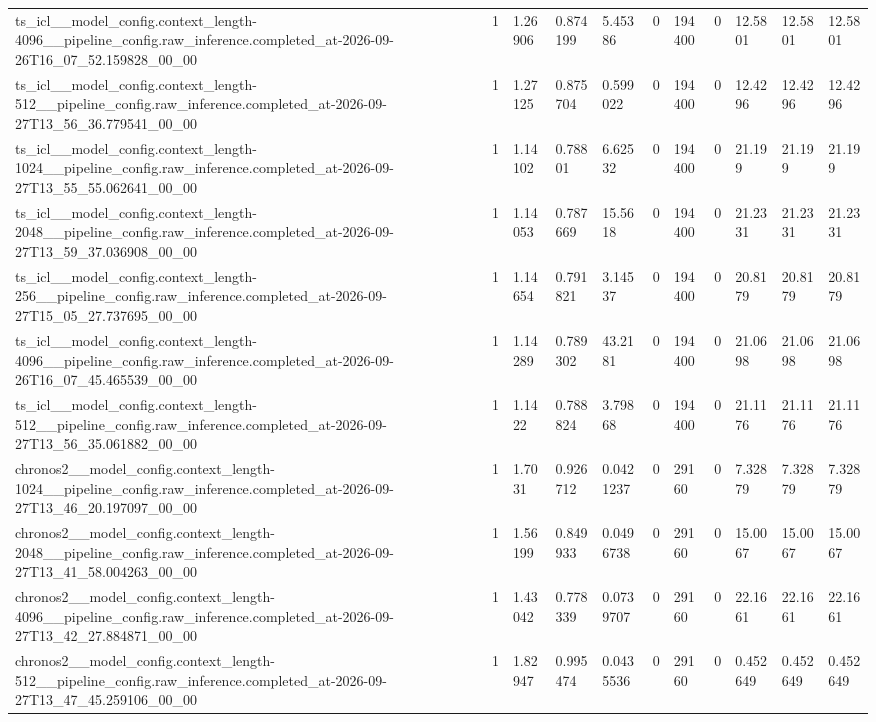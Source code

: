 \begin{tabular}{lllllllllll}
ts\_icl\_\_model\_config.context\_length-4096\_\_pipeline\_config.raw\_inference.completed\_at-2026-09-26T16\_07\_52.159828\_00\_00 & 1 & 1.26906 & 0.874199 & 5.45386 & 0 & 194400 & 0 & 12.5801 & 12.5801 & 12.5801 \\
ts\_icl\_\_model\_config.context\_length-512\_\_pipeline\_config.raw\_inference.completed\_at-2026-09-27T13\_56\_36.779541\_00\_00 & 1 & 1.27125 & 0.875704 & 0.599022 & 0 & 194400 & 0 & 12.4296 & 12.4296 & 12.4296 \\
ts\_icl\_\_model\_config.context\_length-1024\_\_pipeline\_config.raw\_inference.completed\_at-2026-09-27T13\_55\_55.062641\_00\_00 & 1 & 1.14102 & 0.78801 & 6.62532 & 0 & 194400 & 0 & 21.199 & 21.199 & 21.199 \\
ts\_icl\_\_model\_config.context\_length-2048\_\_pipeline\_config.raw\_inference.completed\_at-2026-09-27T13\_59\_37.036908\_00\_00 & 1 & 1.14053 & 0.787669 & 15.5618 & 0 & 194400 & 0 & 21.2331 & 21.2331 & 21.2331 \\
ts\_icl\_\_model\_config.context\_length-256\_\_pipeline\_config.raw\_inference.completed\_at-2026-09-27T15\_05\_27.737695\_00\_00 & 1 & 1.14654 & 0.791821 & 3.14537 & 0 & 194400 & 0 & 20.8179 & 20.8179 & 20.8179 \\
ts\_icl\_\_model\_config.context\_length-4096\_\_pipeline\_config.raw\_inference.completed\_at-2026-09-26T16\_07\_45.465539\_00\_00 & 1 & 1.14289 & 0.789302 & 43.2181 & 0 & 194400 & 0 & 21.0698 & 21.0698 & 21.0698 \\
ts\_icl\_\_model\_config.context\_length-512\_\_pipeline\_config.raw\_inference.completed\_at-2026-09-27T13\_56\_35.061882\_00\_00 & 1 & 1.1422 & 0.788824 & 3.79868 & 0 & 194400 & 0 & 21.1176 & 21.1176 & 21.1176 \\
chronos2\_\_model\_config.context\_length-1024\_\_pipeline\_config.raw\_inference.completed\_at-2026-09-27T13\_46\_20.197097\_00\_00 & 1 & 1.7031 & 0.926712 & 0.0421237 & 0 & 29160 & 0 & 7.32879 & 7.32879 & 7.32879 \\
chronos2\_\_model\_config.context\_length-2048\_\_pipeline\_config.raw\_inference.completed\_at-2026-09-27T13\_41\_58.004263\_00\_00 & 1 & 1.56199 & 0.849933 & 0.0496738 & 0 & 29160 & 0 & 15.0067 & 15.0067 & 15.0067 \\
chronos2\_\_model\_config.context\_length-4096\_\_pipeline\_config.raw\_inference.completed\_at-2026-09-27T13\_42\_27.884871\_00\_00 & 1 & 1.43042 & 0.778339 & 0.0739707 & 0 & 29160 & 0 & 22.1661 & 22.1661 & 22.1661 \\
chronos2\_\_model\_config.context\_length-512\_\_pipeline\_config.raw\_inference.completed\_at-2026-09-27T13\_47\_45.259106\_00\_00 & 1 & 1.82947 & 0.995474 & 0.0435536 & 0 & 29160 & 0 & 0.452649 & 0.452649 & 0.452649 \\

\end{tabular}
